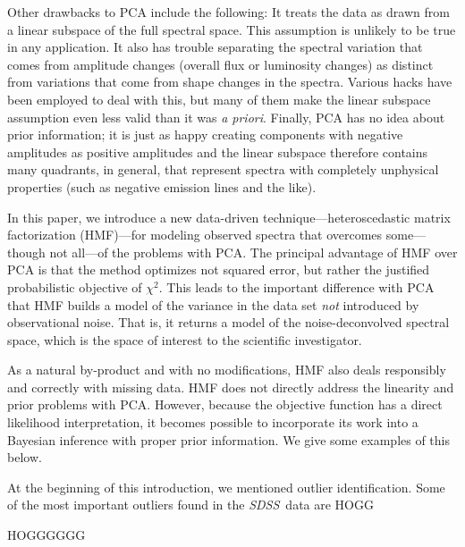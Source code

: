 \documentclass[apj]{emulateapj}
\newcommand{\project}[1]{\textsl{#1}}
\newcommand{\sdss}{\project{SDSS}}
\begin{document}
Other drawbacks to PCA include the following: It treats the data as
drawn from a linear subspace of the full spectral space. This
assumption is unlikely to be true in any application.  It also has
trouble separating the spectral variation that comes from amplitude
changes (overall flux or luminosity changes) as distinct from
variations that come from shape changes in the spectra.  Various hacks
have been employed to deal with this, but many of them make the linear
subspace assumption even less valid than it was \textit{a
  priori}. Finally, PCA has no idea about prior information; it is
just as happy creating components with negative amplitudes as positive
amplitudes and the linear subspace therefore contains many quadrants,
in general, that represent spectra with completely unphysical
properties (such as negative emission lines and the like).

In this paper, we introduce a new data-driven
technique---heteroscedastic matrix factorization (HMF)---for modeling
observed spectra that overcomes some---though not all---of the
problems with PCA.  The principal advantage of HMF over PCA is that
the method optimizes not squared error, but rather the justified
probabilistic objective of $\chi^2$.  This leads to the important
difference with PCA that HMF builds a model of the variance in the
data set \emph{not} introduced by observational noise.  That is, it
returns a model of the noise-deconvolved spectral space, which is the
space of interest to the scientific investigator.

As a natural by-product and with no modifications, HMF also deals
responsibly and correctly with missing data.  HMF does not directly
address the linearity and prior problems with PCA.  However, because
the objective function has a direct likelihood interpretation, it
becomes possible to incorporate its work into a Bayesian inference
with proper prior information.  We give some examples of this below.

At the beginning of this introduction, we mentioned outlier
identification.  Some of the most important outliers found in the
\sdss\ data are HOGG

HOGGGGGG
\end{document}
